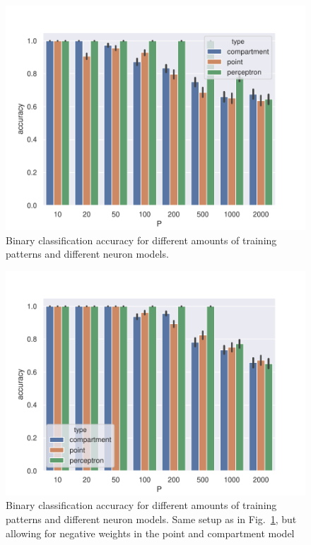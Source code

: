 \documentclass[10pt,a4paper]{article}
\begin{document}
\begin{figure}
	\includegraphics[width=\textwidth]{./figures/accuracy_pattern_number.pdf}
	\caption{Binary classification accuracy for different amounts of training patterns and different neuron models.}
	\label{fig:class_accuracy}
\end{figure}

\begin{figure}
	\includegraphics[width=\textwidth]{./figures/accuracy_pattern_number_no_constraint.pdf}
	\caption{Binary classification accuracy for different amounts of training patterns and different neuron models. Same setup as in Fig.~\ref{fig:class_accuracy}, but allowing for negative weights in the point and compartment model}
	\label{fig:class_accuracy_no_constraint}
\end{figure}
\end{document}

